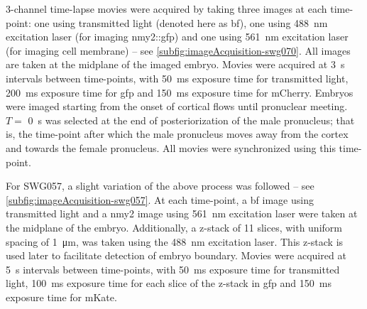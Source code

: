 3-channel time-lapse movies were acquired by taking three images at each time-point: one using transmitted light (denoted here as \ac{bf}), one using \SI{488}{\nano\meter} excitation laser (for imaging \ac{nmy2}::\ac{gfp}) and one using \SI{561}{\nano\meter} excitation laser (for imaging cell membrane) -- see \autoref{subfig:imageAcquisition-swg070}. All images are taken at the midplane of the imaged embryo. Movies were acquired at \SI{3}{\second} intervals between time-points, with \SI{50}{\milli\second} exposure time for transmitted light, \SI{200}{\milli\second} exposure time for \ac{gfp} and \SI{150}{\milli\second} exposure time for mCherry. Embryos were imaged starting from the onset of cortical flows until pronuclear meeting. $T =$ \SI{0}{\second} was selected at the end of posteriorization of the male pronucleus; that is, the time-point after which the male pronucleus moves away from the cortex and towards the female pronucleus. All movies were synchronized using this time-point.

For SWG057, a slight variation of the above process was followed  -- see \autoref{subfig:imageAcquisition-swg057}. At each time-point, a \ac{bf} image using transmitted light and a \ac{nmy2} image using \SI{561}{\nano\meter} excitation laser were taken at the midplane of the embryo. Additionally, a z-stack of \num{11} slices, with uniform spacing of \SI{1}{\micro\meter}, was taken using the \SI{488}{\nano\meter} excitation laser. This z-stack is used later to facilitate detection of embryo boundary. Movies were acquired at \SI{5}{\second} intervals between time-points, with \SI{50}{\milli\second} exposure time for transmitted light, \SI{100}{\milli\second} exposure time for each slice of the z-stack in \ac{gfp} and \SI{150}{\milli\second} exposure time for mKate.

